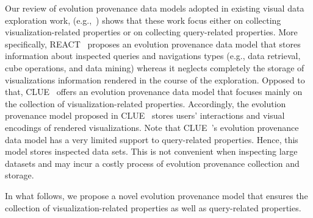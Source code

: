 Our review of evolution provenance data models adopted in existing visual data exploration work, (e.g.,~\cite{Milo:2016,2016_eurovis_clue}) shows that these work focus either on collecting visualization-related properties or on collecting query-related properties.
More specifically, REACT~\cite{Milo:2016} proposes an evolution provenance data model that stores information about inspected queries and navigations types (e.g., data retrieval, cube operations, and data mining) whereas it neglects completely the storage of visualizations information rendered in the course of the exploration.
Opposed to that, CLUE~\cite{2016_eurovis_clue} offers an evolution provenance data model that focuses mainly on the collection of visualization-related properties. Accordingly, the evolution provenance model proposed in CLUE~\cite{2016_eurovis_clue} stores users' interactions and  visual encodings of rendered visualizations. %
Note that CLUE~\cite{2016_eurovis_clue}'s evolution provenance data model has a very limited support to query-related properties. Hence, this model stores inspected data sets. This is not convenient when inspecting large datasets and may incur a costly process of evolution provenance collection and storage.


In what follows, we propose a novel evolution provenance model that ensures the collection of 
visualization-related properties as well as query-related properties.



